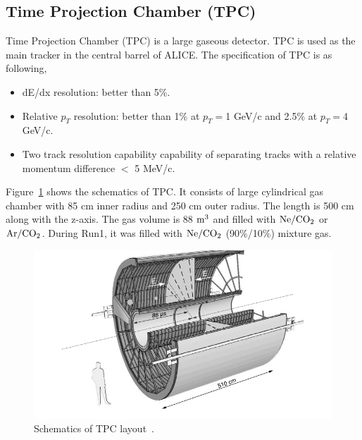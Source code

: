 \subsection{Time Projection Chamber (TPC)}
Time Projection Chamber (TPC) is a large gaseous detector. 
TPC is used as the main tracker in the central barrel of ALICE. 
The specification of TPC is as following, 
\begin{itemize}
\item dE/dx resolution: better than 5\%. \\
\item Relative $p_{T}$ resolution: better than 1\% at $p_{T}=$1 GeV/c and 2.5\% at $p_{T}=$4 GeV/c. \\
\item Two track resolution capability capability of separating tracks with a relative momentum difference $<$ 5 MeV/c.
\end{itemize}
Figure~\ref{fig_3_tpclayout} shows the schematics of TPC.
It consists of large cylindrical gas chamber with 85 cm inner radius and 250 cm outer radius. 
The length is 500 cm along with the z-axis. 
The gas volume is 88 $\rm{m^{3}}$ and filled with $\rm{Ne/CO_{2}}$ or $\rm{Ar/CO_{2}}$.
During Run1, it was filled with $\rm{Ne/CO_{2}}$ (90\%/10\%) mixture gas.
\begin{figure}[!h]
  \centering
  \includegraphics[width=12cm]{chap3/figure/TPC/Schematics_TPC.png}
  \caption{Schematics of TPC layout~\cite{bib_tpctdr}.}
  \label{fig_3_tpclayout}
\end{figure}

